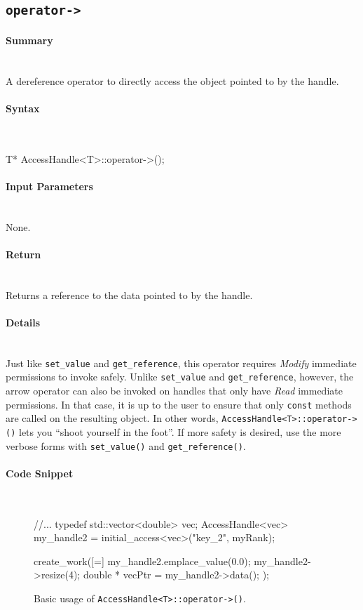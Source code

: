 \subsection{\texttt{operator->}}

\paragraph{Summary}\mbox{}\\
A dereference operator to directly access the object 
pointed to by the handle.

\paragraph{Syntax}\mbox{}\\
\begin{CppCode}
T* AccessHandle<T>::operator->();
\end{CppCode}

\paragraph{Input Parameters}\mbox{}\\
None.

\paragraph{Return}\mbox{}\\
Returns a reference to the data pointed to by the handle.

\paragraph{Details}\mbox{}\\
Just like \texttt{set\_value} and \texttt{get\_reference}, this operator
requires {\it Modify} immediate permissions to invoke safely.  Unlike 
\texttt{set\_value} and \texttt{get\_reference}, however, the arrow operator can
also be invoked on handles that only have {\it Read} immediate permissions.  In
that case, it is up to the user to ensure that only \texttt{const} methods are
called on the resulting object.  In other words,
\texttt{AccessHandle<T>::operator->()} lets you ``shoot yourself in the foot''.
If more safety is desired, use the more  verbose forms with
\texttt{set\_value()} and \texttt{get\_reference()}.


\paragraph{Code Snippet}\mbox{}\\
\begin{figure}[!h]
\begin{CppCodeNumb}
//...
typedef std::vector<double> vec;
AccessHandle<vec> my_handle2 = initial_access<vec>("key_2", myRank);

create_work([=]{
  my_handle2.emplace_value(0.0);
  my_handle2->resize(4);
  double * vecPtr = my_handle2->data();    
});
\end{CppCodeNumb}
\label{fig:fe_api_arrow}
\caption{Basic usage of \texttt{AccessHandle<T>::operator->()}.}
\end{figure}

